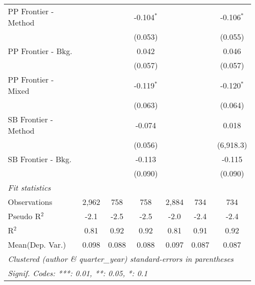 \begin{tabular}{lcccccc}
   PP Frontier - Method &         &         & -0.104$^{*}$ &              &         & -0.106$^{*}$\\   
                        &         &         & (0.053)      &              &         & (0.055)\\   
   PP Frontier - Bkg.   &         &         & 0.042        &              &         & 0.046\\   
                        &         &         & (0.057)      &              &         & (0.057)\\   
   PP Frontier - Mixed  &         &         & -0.119$^{*}$ &              &         & -0.120$^{*}$\\   
                        &         &         & (0.063)      &              &         & (0.064)\\   
   SB Frontier - Method &         &         & -0.074       &              &         & 0.018\\   
                        &         &         & (0.056)      &              &         & (6,918.3)\\   
   SB Frontier - Bkg.   &         &         & -0.113       &              &         & -0.115\\   
                        &         &         & (0.090)      &              &         & (0.090)\\   
   \midrule
   \emph{Fit statistics}\\
   Observations         & 2,962   & 758     & 758          & 2,884        & 734     & 734\\  
   Pseudo R$^2$         & -2.1    & -2.5    & -2.5         & -2.0         & -2.4    & -2.4\\  
   R$^2$                & 0.81    & 0.92    & 0.92         & 0.81         & 0.91    & 0.92\\  
Mean(Dep. Var.) & 0.098 & 0.088 & 0.088 & 0.097 & 0.087 & 0.087 \\
   \midrule \midrule
   \multicolumn{7}{l}{\emph{Clustered (author \& quarter\_year) standard-errors in parentheses}}\\
   \multicolumn{7}{l}{\emph{Signif. Codes: ***: 0.01, **: 0.05, *: 0.1}}\\
\end{tabular}
\par\endgroup
